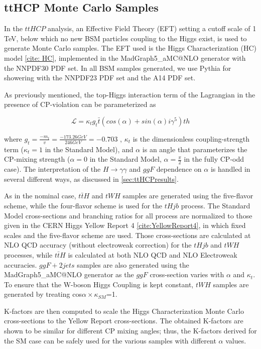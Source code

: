 \subsection{ttHCP Monte Carlo Samples} \label{sec:ttHCPMC} 

In the $ttH CP$ analysis, an Effective Field Theory (EFT) setting a cutoff scale of 1 TeV, below which no new BSM particles coupling to the Higgs exist, is used to generate Monte Carlo samples. The EFT used is the Higgs Characterization (HC) model \ref{cite: HC}, implemented in the MadGraph5\_aMC@NLO generator with the NNPDF30 PDF set. In all BSM samples generated, we use Pythia for showering with the NNPDF23 PDF set and the A14 PDF set.

As previously mentioned, the top-Higgs interaction term of the Lagrangian in the presence of CP-violation can be parameterized as

\begin{equation}
\mathcal{L} = \kappa_{t} g_{t} \bar{t} (cos(\alpha)+ sin(\alpha) i \gamma^{5} )th
\end{equation}

where $g_{t} = \frac{-m_{t}}{v} = \frac{-173.26 GeV}{246 GeV} = -0.703$ , $\kappa_{t}$ is the dimensionless coupling-strength term ($\kappa_{t}= 1$ in the Standard Model), and $\alpha$ is an angle that parameterizes the CP-mixing strength ($\alpha = 0$ in the Standard Model, $\alpha = \frac{\pi}{2}$ in the fully CP-odd case). The interpretation of the $H \rightarrow \gamma \gamma$ and $ggF$ dependence on $\alpha$ is handled in several different ways, as discussed in \ref{sec:ttHCPresults}.

As in the nominal case, $t\bar{t}H$ and $tWH$ samples are generated using the five-flavor scheme, while the four-flavor scheme is used for the $tHjb$ process. The Standard Model cross-sections and branching ratios for all process are normalized to those given in the CERN Higgs Yellow Report 4 \ref{cite:YellowReport4}, in which fixed scales and the five-flavor scheme are used. Those cross-sections are calculated at NLO QCD accuracy (without electroweak correction) for the $tHjb$ and $tWH$ processes, while $t\bar{t}H$ is calculated at both NLO QCD and NLO Electroweak accuracies. $ggF+ 2 jets$ samples are also generated using the MadGraph5\_aMC@NLO generator as the $ggF$ cross-section varies with $\alpha$ and $\kappa_{t}$. To ensure that the W-boson Higgs Coupling is kept constant, $tWH$ samples are generated by treating cos$\alpha \times \kappa_{SM}$=1.


K-factors are then computed to scale the Higgs Characterization Monte Carlo cross-sections to the Yellow Report cross-sections. The obtained K-factors are shown to be similar for different CP mixing angles; thus, the K-factors derived for the SM case can be safely used for the various samples with different $\alpha$ values. 

